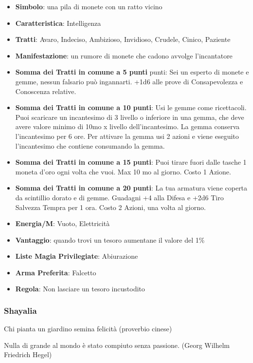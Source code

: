 \begin{multicols}{2}
\begin{itemize}[leftmargin=*] \setlength{\itemsep}{0pt}
\item \textbf{Simbolo}: una pila di monete con un ratto vicino
\item \textbf{Caratteristica}: Intelligenza
\item \textbf{Tratti}: Avaro, Indeciso, Ambizioso, Invidioso, Crudele, Cinico, Paziente
\item \textbf{Manifestazione}: un rumore di monete che cadono avvolge l'incantatore
\item \textbf{Somma dei Tratti in comune a 5 punti} punti: Sei un esperto di monete e gemme, nessun falsario può ingannarti. +1d6 alle prove di Consapevolezza e Conoscenza relative.
\item \textbf{Somma dei Tratti in comune a 10 punti}: Usi le gemme come ricettacoli. Puoi scaricare un incantesimo di 3 livello o inferiore in una gemma, che deve avere valore minimo di 10mo x livello dell'incantesimo. La gemma conserva l'incantesimo per 6 ore. Per attivare la gemma usi 2 azioni e viene eseguito l'incantesimo che contiene consumando la gemma.
\item \textbf{Somma dei Tratti in comune a 15 punti}: Puoi tirare fuori dalle tasche 1 moneta d'oro ogni volta che vuoi. Max 10 mo al giorno. Costo 1 Azione.
\item \textbf{Somma dei Tratti in comune a 20 punti}: La tua armatura viene coperta da scintillio dorato e di gemme. Guadagni +4 alla Difesa e +2d6 Tiro Salvezza Tempra per 1 ora. Costo 2 Azioni, una volta al giorno.
\item \textbf{Energia/M}: Vuoto, Elettricità
\item \textbf{Vantaggio}: quando trovi un tesoro aumentane il valore del 1\%
\item \textbf{Liste Magia Privilegiate}: Abiurazione
\item \textbf{Arma Preferita}: Falcetto
\item \textbf{Regola}: Non lasciare un tesoro incustodito
\end{itemize}

\subsubsection{Shayalia}\label{shayalia}\hypertarget{shayalia}{}

\begin{enfasi}{
Chi pianta un giardino semina felicità (proverbio cinese)

\medskip

Nulla di grande al mondo è stato compiuto senza passione. (Georg Wilhelm Friedrich Hegel)

}\end{enfasi}


\end{multicols}
